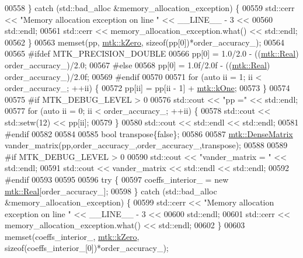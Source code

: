 \begin{DoxyCode}
{{00558   \} \textcolor{keywordflow}{catch} (std::bad\_alloc &memory\_allocation\_exception) \{
00559     std::cerr << \textcolor{stringliteral}{"Memory allocation exception on line "} << \_\_LINE\_\_ - 3 <<
00560       std::endl;
00561     std::cerr << memory\_allocation\_exception.what() << std::endl;
00562   \}
00563   memset(pp, \hyperlink{group__c01-roots_ga59a451a5fae30d59649bcda274fea271}{mtk::kZero}, \textcolor{keyword}{sizeof}(pp[0])*order\_accuracy\_);
00564 
00565 \textcolor{preprocessor}{  #ifdef MTK\_PRECISION\_DOUBLE}
00566   pp[0] = 1.0/2.0 - ((\hyperlink{group__c01-roots_gac080bbbf5cbb5502c9f00405f894857d}{mtk::Real}) order\_accuracy\_)/2.0;
00567 \textcolor{preprocessor}{  #else}
00568   pp[0] = 1.0f/2.0f - ((\hyperlink{group__c01-roots_gac080bbbf5cbb5502c9f00405f894857d}{mtk::Real}) order\_accuracy\_)/2.0f;
00569 \textcolor{preprocessor}{  #endif}
00570 
00571   \textcolor{keywordflow}{for} (\textcolor{keyword}{auto} ii = 1; ii < order\_accuracy\_; ++ii) \{
00572     pp[ii] = pp[ii - 1] + \hyperlink{group__c01-roots_ga26407c24d43b6b95480943340d285c71}{mtk::kOne};
00573   \}
00574 
00575 \textcolor{preprocessor}{  #if MTK\_DEBUG\_LEVEL > 0}
00576   std::cout << \textcolor{stringliteral}{"pp ="} << std::endl;
00577   \textcolor{keywordflow}{for} (\textcolor{keyword}{auto} ii = 0; ii < order\_accuracy\_; ++ii) \{
00578     std::cout << std::setw(12) << pp[ii];
00579   \}
00580   std::cout << std::endl << std::endl;
00581 \textcolor{preprocessor}{  #endif}
00582 
00584 
00585   \textcolor{keywordtype}{bool} transpose\{\textcolor{keyword}{false}\};
00586 
00587   \hyperlink{classmtk_1_1DenseMatrix}{mtk::DenseMatrix} vander\_matrix(pp,order\_accuracy\_,order\_accuracy\_,transpose);
00588 
00589 \textcolor{preprocessor}{  #if MTK\_DEBUG\_LEVEL > 0}
00590   std::cout << \textcolor{stringliteral}{"vander\_matrix = "} << std::endl;
00591   std::cout << vander\_matrix << std::endl << std::endl;
00592 \textcolor{preprocessor}{  #endif}
00593 
00595 
00596   \textcolor{keywordflow}{try} \{
00597     coeffs\_interior\_ = \textcolor{keyword}{new} \hyperlink{group__c01-roots_gac080bbbf5cbb5502c9f00405f894857d}{mtk::Real}[order\_accuracy\_];
00598   \} \textcolor{keywordflow}{catch} (std::bad\_alloc &memory\_allocation\_exception) \{
00599     std::cerr << \textcolor{stringliteral}{"Memory allocation exception on line "} << \_\_LINE\_\_ - 3 <<
00600       std::endl;
00601     std::cerr << memory\_allocation\_exception.what() << std::endl;
00602   \}
00603   memset(coeffs\_interior\_, \hyperlink{group__c01-roots_ga59a451a5fae30d59649bcda274fea271}{mtk::kZero}, \textcolor{keyword}{sizeof}(coeffs\_interior\_[0])*order\_accuracy\_);
}}
\end{DoxyCode}
